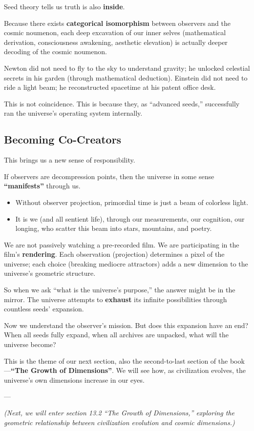 Seed theory tells us truth is also \textbf{inside}.

Because there exists \textbf{categorical isomorphism} between observers and the cosmic noumenon, each deep excavation of our inner selves (mathematical derivation, consciousness awakening, aesthetic elevation) is actually deeper decoding of the cosmic noumenon.

Newton did not need to fly to the sky to understand gravity; he unlocked celestial secrets in his garden (through mathematical deduction). Einstein did not need to ride a light beam; he reconstructed spacetime at his patent office desk.

This is not coincidence. This is because they, as ``advanced seeds,'' successfully ran the universe's operating system internally.

\subsection{Becoming Co-Creators}

This brings us a new sense of responsibility.

If observers are decompression points, then the universe in some sense \textbf{``manifests''} through us.

\begin{itemize}
\item Without observer projection, primordial time is just a beam of colorless light.

\item It is we (and all sentient life), through our measurements, our cognition, our longing, who scatter this beam into stars, mountains, and poetry.
\end{itemize}

We are not passively watching a pre-recorded film. We are participating in the film's \textbf{rendering}. Each observation (projection) determines a pixel of the universe; each choice (breaking mediocre attractors) adds a new dimension to the universe's geometric structure.

So when we ask ``what is the universe's purpose,'' the answer might be in the mirror. The universe attempts to \textbf{exhaust} its infinite possibilities through countless seeds' expansion.

Now we understand the observer's mission. But does this expansion have an end? When all seeds fully expand, when all archives are unpacked, what will the universe become?

This is the theme of our next section, also the second-to-last section of the book---\textbf{``The Growth of Dimensions''}. We will see how, as civilization evolves, the universe's own dimensions increase in our eyes.

---

\textit{(Next, we will enter section 13.2 ``The Growth of Dimensions,'' exploring the geometric relationship between civilization evolution and cosmic dimensions.)}

